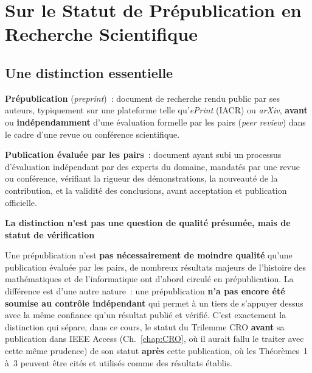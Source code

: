 \section{Sur le Statut de Prépublication en Recherche Scientifique}
\label{sec:statut-prepublication}

\subsection{Une distinction essentielle}

\begin{boxdef}
\textbf{Prépublication}
(\textit{preprint})~: document de recherche rendu public par ses
auteurs, typiquement sur une plateforme telle qu'\textit{ePrint}
(IACR) ou \textit{arXiv}, \textbf{avant} ou \textbf{indépendamment}
d'une évaluation formelle par les pairs (\textit{peer review}) dans
le cadre d'une revue ou conférence scientifique.

\textbf{Publication évaluée par les pairs}~: document ayant subi
un processus d'évaluation indépendant par des experts du domaine,
mandatés par une revue ou conférence, vérifiant la rigueur des
démonstrations, la nouveauté de la contribution, et la validité
des conclusions, avant acceptation et publication officielle.
\end{boxdef}

\begin{boxalert}
\textbf{La distinction n'est pas une question de qualité présumée,
mais de statut de vérification}

Une prépublication n'est \textbf{pas nécessairement de moindre
qualité} qu'une publication évaluée par les pairs, de nombreux
résultats majeurs de l'histoire des mathématiques et de
l'informatique ont d'abord circulé en prépublication. La
différence est d'une autre nature~: une prépublication
\textbf{n'a pas encore été soumise au contrôle indépendant} qui
permet à un tiers de s'appuyer dessus avec la même confiance
qu'un résultat publié et vérifié. C'est exactement la distinction
qui sépare, dans ce cours, le statut du Trilemme CRO \textbf{avant}
sa publication dans IEEE Access (Ch.~\ref{chap:CRO}, où il aurait
fallu le traiter avec cette même prudence) de son statut
\textbf{après} cette publication, où les Théorèmes~1 à~3 peuvent
être cités et utilisés comme des résultats établis.
\end{boxalert}

